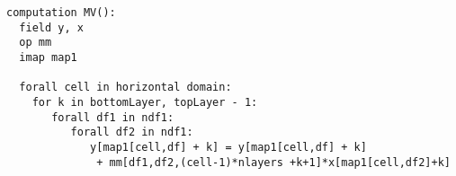 \documentclass{report}
\begin{document}
\begin{lstlisting}[style=dsl]
computation MV():
  field y, x
  op mm
  imap map1

  forall cell in horizontal domain:
    for k in bottomLayer, topLayer - 1:
       forall df1 in ndf1:
          forall df2 in ndf1:
             y[map1[cell,df] + k] = y[map1[cell,df] + k] 
              + mm[df1,df2,(cell-1)*nlayers +k+1]*x[map1[cell,df2]+k]


\end{lstlisting}
\end{document}
